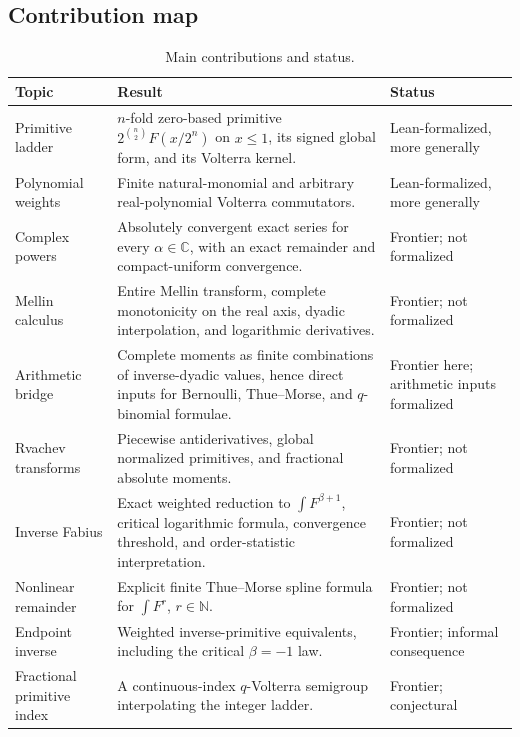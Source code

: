 \documentclass[11pt,oneside]{article}
\numberwithin{equation}{section}
\theoremstyle{definition}
\theoremstyle{remark}
\newcommand{\C}{\mathbb C}
\newcommand{\N}{\mathbb N}
\begin{document}
\subsection{Contribution map}
\begin{table}[ht]
\centering
\small
\begin{tabularx}{\textwidth}{@{}p{}X p{}@{}}
\toprule
Topic & Result & Status \\
\midrule
Primitive ladder &
$n$-fold zero-based primitive $2^{\binom n2}F(x/2^n)$ on $x\le1$, its
signed global form, and its Volterra kernel. &
Lean-formalized, more generally \\
Polynomial weights &
Finite natural-monomial and arbitrary real-polynomial Volterra commutators. &
Lean-formalized, more generally \\
Complex powers &
Absolutely convergent exact series for every $\alpha\in\C$, with an exact
remainder and compact-uniform convergence. & Frontier; not formalized \\
Mellin calculus &
Entire Mellin transform, complete monotonicity on the real axis, dyadic
interpolation, and logarithmic derivatives. & Frontier; not formalized \\
Arithmetic bridge &
Complete moments as finite combinations of inverse-dyadic values, hence direct
inputs for Bernoulli, Thue--Morse, and $q$-binomial formulae. &
Frontier here; arithmetic inputs formalized \\
Rvachev transforms &
Piecewise antiderivatives, global normalized primitives, and fractional
absolute moments. & Frontier; not formalized \\
Inverse Fabius &
Exact weighted reduction to $\int F^{\beta+1}$, critical logarithmic formula,
convergence threshold, and order-statistic interpretation. &
Frontier; not formalized \\
Nonlinear remainder &
Explicit finite Thue--Morse spline formula for $\int F^r$, $r\in\N$. &
Frontier; not formalized \\
Endpoint inverse &
Weighted inverse-primitive equivalents, including the critical $\beta=-1$
law. & Frontier; informal consequence \\
Fractional primitive index &
A continuous-index $q$-Volterra semigroup interpolating the integer ladder. &
Frontier; conjectural \\
\bottomrule
\end{tabularx}
\caption{Main contributions and status.}
\label{tab:contribution-map}
\end{table}
\end{document}
